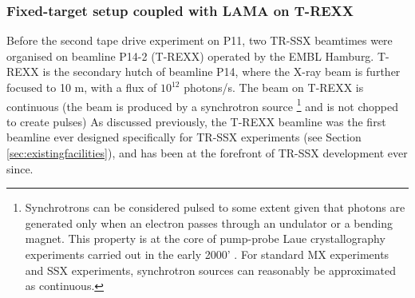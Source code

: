 \subsubsection{Fixed-target setup coupled with LAMA on T-REXX}\label{sec:LAMA}

Before the second tape drive experiment on P11, two TR-SSX beamtimes were organised on beamline P14-2 (T-REXX) operated by the EMBL Hamburg.  T-REXX is the secondary hutch of beamline P14, where the X-ray beam is further focused to 10 \textmu m, with a flux of \(10^{12}\) photons/s. The beam on T-REXX is continuous (the beam is produced by a synchrotron source \footnote{Synchrotrons can be considered pulsed to some extent given that photons are generated only when an electron passes through an undulator or a bending magnet. This property is at the core of pump-probe Laue crystallography experiments carried out in the early 2000' \parencite{srajerPhotolysisCarbonMonoxide1996, moffatLaueDiffractionTimeresolved2019}. For standard MX experiments and SSX experiments, synchrotron sources can reasonably be approximated as continuous.} and is not chopped to create pulses) As discussed previously, the T-REXX beamline was the first beamline ever designed specifically for TR-SSX experiments (see Section \ref{sec:existingfacilities}), and has been at the forefront of TR-SSX development ever since.  

